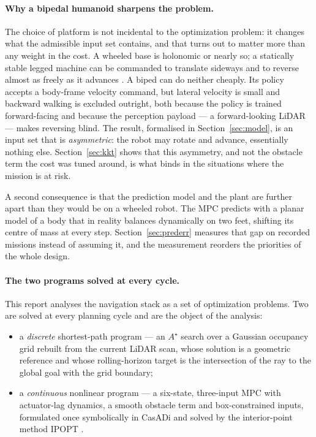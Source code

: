 \documentclass[11pt,a4paper]{article}
\newcommand{\astar}{$A^\star$}
\begin{document}
\paragraph{Why a bipedal humanoid sharpens the problem.}
The choice of platform is not incidental to the optimization problem: it changes what the admissible input
set contains, and that turns out to matter more than any weight in the cost. A wheeled base is holonomic or
nearly so; a statically stable legged machine can be commanded to translate sideways and to reverse almost as
freely as it advances \cite{raibert1986legged}. A biped can do neither cheaply. Its policy accepts a
body-frame velocity command, but lateral velocity is small and backward walking is excluded outright, both
because the policy is trained forward-facing and because the perception payload --- a forward-looking LiDAR
--- makes reversing blind. The result, formalised in Section~\ref{sec:model}, is an input set that is
\emph{asymmetric}: the robot may rotate and advance, essentially nothing else. Section~\ref{sec:kkt} shows
that this asymmetry, and not the obstacle term the cost was tuned around, is what binds in the situations
where the mission is at risk.

A second consequence is that the prediction model and the plant are further apart than they would be on a
wheeled robot. The MPC predicts with a planar model of a body that in reality balances dynamically on two
feet, shifting its centre of mass at every step. Section~\ref{sec:prederr} measures that gap on recorded
missions instead of assuming it, and the measurement reorders the priorities of the whole design.

\paragraph{The two programs solved at every cycle.}
This report analyses the navigation stack as a set of optimization problems. Two are solved at every
planning cycle and are the object of the analysis:

\begin{itemize}
  \item a \emph{discrete} shortest-path program --- an \astar{} search \cite{hart1968astar} over a Gaussian
        occupancy grid rebuilt from the current LiDAR scan, whose solution is a geometric reference and whose
        rolling-horizon target is the intersection of the ray to the global goal with the grid boundary;
  \item a \emph{continuous} nonlinear program --- a six-state, three-input MPC with actuator-lag dynamics, a
        smooth obstacle term and box-constrained inputs, formulated once symbolically in CasADi
        \cite{andersson2019casadi} and solved by the interior-point method IPOPT \cite{wachter2006ipopt}.
\end{itemize}
\end{document}
